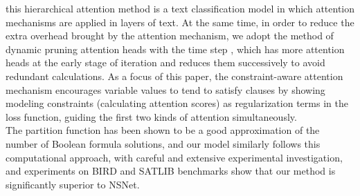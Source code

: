 this hierarchical attention method is a text classification model in which attention mechanisms are applied in layers of text. At the same time, 
in order to reduce the extra overhead brought by the attention mechanism, we adopt the method of dynamic pruning attention heads with the time step
\cite{B6}\cite{A16}, which has more attention heads at the early stage of iteration and reduces them successively to avoid redundant calculations.
As a focus of this paper, the constraint-aware attention mechanism encourages variable values to tend to satisfy clauses by showing modeling 
constraints (calculating attention scores) as regularization terms in the loss function, guiding the first two kinds of attention simultaneously. \\
The partition function has been shown to be a good approximation of the number of Boolean formula solutions\cite{A17}\cite{A18}, and our model 
similarly follows this computational approach, with careful and extensive experimental investigation, and experiments on BIRD and SATLIB benchmarks 
show that our method is significantly superior to NSNet. 
